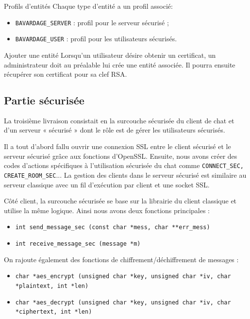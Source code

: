 \documentclass[a4paper,11pt,french]{book}
\begin{document}
\begin{paragraph}{Profils d'entités}
Chaque type d'entité a un profil associé:
\begin{itemize}
\item \verb+BAVARDAGE_SERVER+ : profil pour le serveur sécurisé ;
\item \verb+BAVARDAGE_USER+ : profil pour les utilisateurs sécurisés.
\end{itemize}
\end{paragraph}


\begin{paragraph}{Ajouter une entité}
Lorsqu'un utilisateur désire obtenir un certificat, un administrateur doit au préalable lui crée une entité associée. Il pourra ensuite récupérer son certificat pour sa clef RSA.
\end{paragraph}


\subsection{Partie sécurisée}
La troisième livraison consistait en la surcouche sécurisée du client de chat et d'un serveur « sécurisé » dont le rôle est de gérer les utilisateurs sécurisés.

Il a tout d'abord fallu ouvrir une connexion SSL entre le client sécurisé et le serveur sécurisé grâce aux fonctions d'OpenSSL. Ensuite, nous avons créer des codes d'actions spécifiques à l'utilisation sécurisée du chat comme \verb+CONNECT_SEC, CREATE_ROOM_SEC+... La gestion des clients dans le serveur sécurisé est similaire au serveur classique avec un fil d'exécution par client et une socket SSL.

Côté client, la surcouche sécurisée se base sur la librairie du client classique et utilise la même logique. Ainsi nous avons deux fonctions principales : 
\begin{itemize}
\item \verb+int send_message_sec (const char *mess, char **err_mess)+
\item \verb+int receive_message_sec (message *m)+
\end{itemize}

On rajoute également des fonctions de chiffrement/déchiffrement de messages :
\small{
\begin{itemize}
\item \verb+char *aes_encrypt (unsigned char *key, unsigned char *iv, char *plaintext, int *len)+

\item \verb+char *aes_decrypt (unsigned char *key, unsigned char *iv, char *ciphertext, int *len)+
\end{itemize}
}
\end{document}
